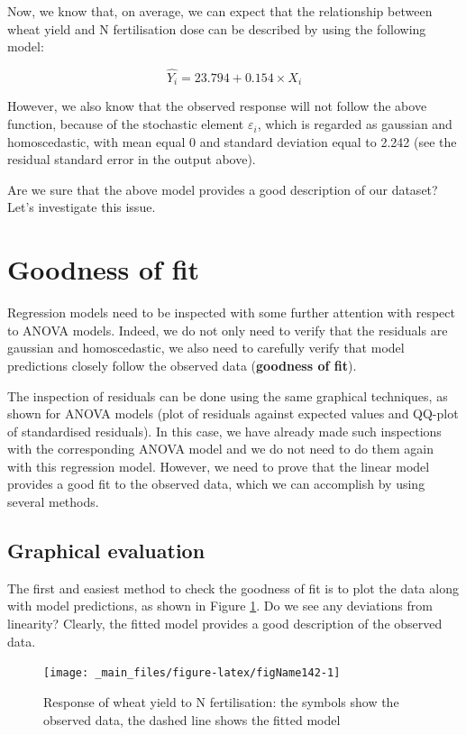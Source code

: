 \documentclass[a4paper,12pt,oneside]{book}
\begin{document}
Now, we know that, on average, we can expect that the relationship between wheat yield and N fertilisation dose can be described by using the following model:

\[\hat{Y_i} = 23.794 + 0.154 \times X_i\]

However, we also know that the observed response will not follow the above function, because of the stochastic element \(\varepsilon_i\), which is regarded as gaussian and homoscedastic, with mean equal 0 and standard deviation equal to 2.242 (see the residual standard error in the output above).

Are we sure that the above model provides a good description of our dataset? Let's investigate this issue.

\hypertarget{goodness-of-fit}{%
\section{Goodness of fit}\label{goodness-of-fit}}

Regression models need to be inspected with some further attention with respect to ANOVA models. Indeed, we do not only need to verify that the residuals are gaussian and homoscedastic, we also need to carefully verify that model predictions closely follow the observed data (\textbf{goodness of fit}).

The inspection of residuals can be done using the same graphical techniques, as shown for ANOVA models (plot of residuals against expected values and QQ-plot of standardised residuals). In this case, we have already made such inspections with the corresponding ANOVA model and we do not need to do them again with this regression model. However, we need to prove that the linear model provides a good fit to the observed data, which we can accomplish by using several methods.

\hypertarget{graphical-evaluation}{%
\subsection{Graphical evaluation}\label{graphical-evaluation}}

The first and easiest method to check the goodness of fit is to plot the data along with model predictions, as shown in Figure \ref{fig:figName142}. Do we see any deviations from linearity? Clearly, the fitted model provides a good description of the observed data.

\begin{figure}

{\centering \texttt{[image: \_main\_files/figure-latex/figName142-1]} 

}

\caption{Response of wheat yield to N fertilisation: the symbols show the observed data, the dashed line shows the fitted model}\label{fig:figName142}
\end{figure}
\end{document}
